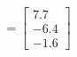 \documentclass[preview]{standalone}
\begin{document}
\begin{align*}
=\begin{bmatrix} 7.7 \\ -6.4 \\ -1.6 \end{bmatrix}
\end{align*}
\end{document}
